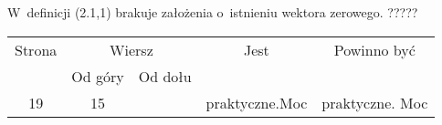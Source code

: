 \documentclass[a4paper,11pt]{article}
\numberwithin{equation}{section}
\begin{document}

\vspace{0em}



\vspace{0em}


\noindent
{} W~definicji (2.1,1) brakuje założenia o~istnieniu wektora zerowego. ?????

\VerSpaceFour





\newpage



\begin{center}

  \begin{tabular}{|c|c|c|c|c|}
    \hline
    Strona & \multicolumn{2}{c|}{Wiersz} & Jest
                              & Powinno być \\ \cline{2-3}
    & Od góry & Od dołu & & \\
    \hline
    19  & 15 & & praktyczne.Moc & praktyczne. Moc \\
    \hline
  \end{tabular}

\end{center}

\VerSpaceTwo














\printbibliography





\end{document}
